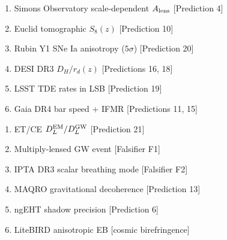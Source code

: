 \documentclass[11pt,a4paper]{article}
\begin{document}
\begin{tcolorbox}[colback=yellow!5!white, colframe=orange!60!black,
  title=\textbf{Near-Term (2027--2030)}]
\begin{enumerate}[nosep]
\item Simons Observatory scale-dependent $A_{\rm lens}$ [Prediction 4]
\item Euclid tomographic $S_8(z)$ [Prediction 10]
\item Rubin Y1 SNe Ia anisotropy ($5\sigma$) [Prediction 20]
\item DESI DR3 $D_H/r_d(z)$ [Predictions 16, 18]
\item LSST TDE rates in LSB [Prediction 19]
\item Gaia DR4 bar speed + IFMR [Predictions 11, 15]
\end{enumerate}
\end{tcolorbox}

\begin{tcolorbox}[colback=blue!5!white, colframe=blue!60!black,
  title=\textbf{Long-Term (2030--2040)}]
\begin{enumerate}[nosep]
\item ET/CE $D_L^{\rm EM}/D_L^{\rm GW}$ [Prediction 21]
\item Multiply-lensed GW event [Falsifier F1]
\item IPTA DR3 scalar breathing mode [Falsifier F2]
\item MAQRO gravitational decoherence [Prediction 13]
\item ngEHT shadow precision [Prediction 6]
\item LiteBIRD anisotropic EB [cosmic birefringence]
\end{enumerate}
\end{tcolorbox}
\end{document}
